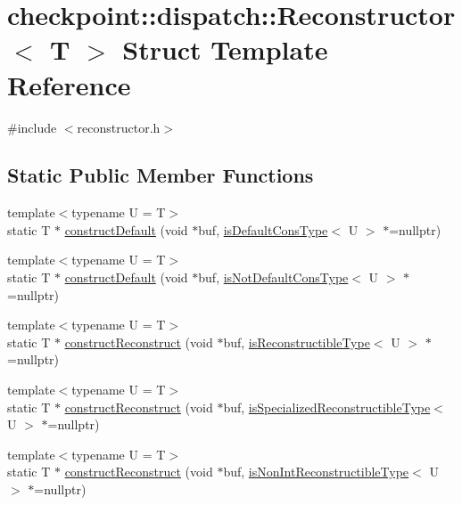 \hypertarget{structcheckpoint_1_1dispatch_1_1_reconstructor}{}\section{checkpoint\+:\+:dispatch\+:\+:Reconstructor$<$ T $>$ Struct Template Reference}
\label{structcheckpoint_1_1dispatch_1_1_reconstructor}


{\ttfamily \#include $<$reconstructor.\+h$>$}

\subsection*{Static Public Member Functions}
\begin{DoxyCompactItemize}
\item 
{\footnotesize template$<$typename U  = T$>$ }\\static T $\ast$ \hyperlink{structcheckpoint_1_1dispatch_1_1_reconstructor_af09a6d0312dbed7c8a311350b689794d}{construct\+Default} (void $\ast$buf, \hyperlink{namespacecheckpoint_a58224a3b056d9e2aa73d563871981a7d}{is\+Default\+Cons\+Type}$<$ U $>$ $\ast$=nullptr)
\item 
{\footnotesize template$<$typename U  = T$>$ }\\static T $\ast$ \hyperlink{structcheckpoint_1_1dispatch_1_1_reconstructor_a74ded346aaee98f25dc498322e6e1411}{construct\+Default} (void $\ast$buf, \hyperlink{namespacecheckpoint_a4032c86e7c92702198dd675a2696ee2c}{is\+Not\+Default\+Cons\+Type}$<$ U $>$ $\ast$=nullptr)
\item 
{\footnotesize template$<$typename U  = T$>$ }\\static T $\ast$ \hyperlink{structcheckpoint_1_1dispatch_1_1_reconstructor_a86a95e9ca24e30a627ed6626f19db4a2}{construct\+Reconstruct} (void $\ast$buf, \hyperlink{namespacecheckpoint_a126da7cae6bbbec231bb2552dc3ad6cc}{is\+Reconstructible\+Type}$<$ U $>$ $\ast$=nullptr)
\item 
{\footnotesize template$<$typename U  = T$>$ }\\static T $\ast$ \hyperlink{structcheckpoint_1_1dispatch_1_1_reconstructor_a4c1529ff50346df55cd3abd98e375cdd}{construct\+Reconstruct} (void $\ast$buf, \hyperlink{namespacecheckpoint_a30b2672bbbe0c21d2b88edb1ddaec19a}{is\+Specialized\+Reconstructible\+Type}$<$ U $>$ $\ast$=nullptr)
\item 
{\footnotesize template$<$typename U  = T$>$ }\\static T $\ast$ \hyperlink{structcheckpoint_1_1dispatch_1_1_reconstructor_ad1362a1e66b441a04e4bb4b7245eb3c4}{construct\+Reconstruct} (void $\ast$buf, \hyperlink{namespacecheckpoint_a46b7909fb0fef92b4787567fde7c760b}{is\+Non\+Int\+Reconstructible\+Type}$<$ U $>$ $\ast$=nullptr)

\end{DoxyCompactItemize}
